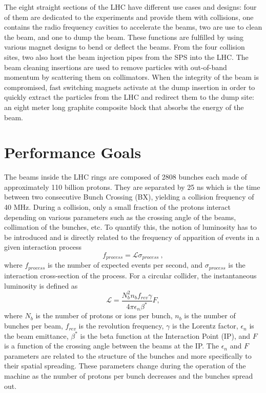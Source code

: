     The eight straight sections of the LHC have different use cases and designs: four of them are dedicated to the experiments and provide them with collisions, one contains the radio frequency cavities to accelerate the beams, two are use to clean the beam, and one to dump the beam. These functions are fulfilled by using various magnet designs to bend or deflect the beams. From the four collision sites, two also host the beam injection pipes from the SPS into the LHC. The beam cleaning insertions are used to remove particles with out-of-band momentum by scattering them on collimators. When the integrity of the beam is compromised, fast switching magnets activate at the dump insertion in order to quickly extract the particles from the LHC and redirect them to the dump site: an eight meter long graphite composite block that absorbs the energy of the beam.

	\section{Performance Goals}

  	The beams inside the LHC rings are composed of 2808 bunches each made of approximately 110 billion protons. They are separated by 25 ns which is the time between two consecutive Bunch Crossing (BX), yielding a collision frequency of 40 MHz. During a collision, only a small fraction of the protons interact depending on various parameters such as the crossing angle of the beams, collimation of the bunches, etc. To quantify this, the notion of luminosity has to be introduced and is directly related to the frequency of apparition of events in a given interaction process
  	\begin{equation}
  		f_{process} = \mathcal{L} \sigma_{process} \ ,
  	\end{equation}
  	where $ f_{process} $ is the number of expected events per second, and $ \sigma_{process} $ is the interaction cross-section of the process. For a circular collider, the instantaneous luminosity is defined as
  	\begin{equation}
  		\mathcal{L} = \frac{N^2_b n_b f_{rev} \gamma}{4 \pi \epsilon_n \beta^*} F ,
  	\end{equation}
  	where $ N_b $ is the number of protons or ions per bunch, $ n_b $ is the number of bunches per beam, $ f_{rev} $ is the revolution frequency, $ \gamma $ is the Lorentz factor, $ \epsilon_n $ is the beam emittance, $ \beta^* $ is the beta function at the Interaction Point (IP), and $ F $ is a function of the crossing angle between the beams at the IP. The $ \epsilon_n $ and $ F $ parameters are related to the structure of the bunches and more specifically to their spatial spreading. These parameters change during the operation of the machine as the number of protons per bunch decreases and the bunches spread out. \\

